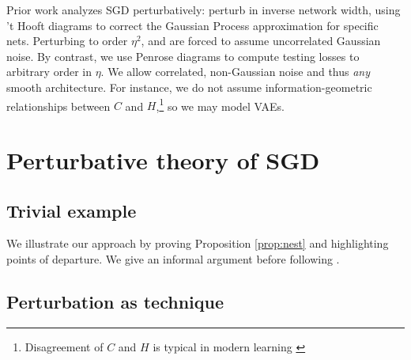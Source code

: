 \documentclass[final,12pt]{colt2021} %
\begin{document}
        
            Prior work analyzes SGD perturbatively: \cite{dy19} perturb in
            inverse network width, using 't Hooft diagrams to correct the
            Gaussian Process approximation for specific nets.  Perturbing
            to order $\eta^2$, \cite{ch18} and \cite{li17} are forced to assume
            uncorrelated Gaussian noise.  By contrast, we use Penrose diagrams
            to compute testing losses to arbitrary order in $\eta$.  We allow
            correlated, non-Gaussian noise and thus \emph{any} smooth
            architecture.  For instance, we do not assume information-geometric
            relationships between $C$ and $H$,\footnote{
                Disagreement of $C$ and
                $H$ is typical in modern learning \citep{ro12, ku19}
            } so we may model VAEs. 

    \section{Perturbative theory of SGD}

        \subsection{Trivial example}

            We illustrate our approach by proving Proposition \ref{prop:nest}
            and highlighting points of departure.  We give an informal
            argument before following \cite{ne04,ro18}.


        \subsection{Perturbation as technique}
\end{document}
